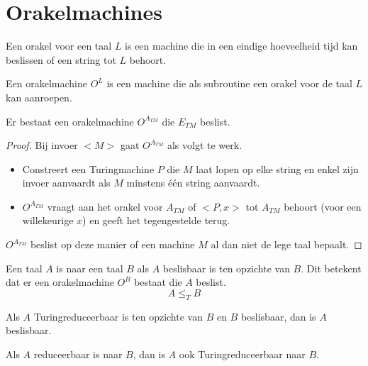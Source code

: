 \documentclass[main.tex]{subfiles}
\begin{document}
\section{Orakelmachines}
\label{sec:orakelmachines}

\begin{de}
  Een orakel voor een taal $L$ is een machine die in een eindige hoeveelheid tijd kan beslissen of een string tot $L$ behoort.
\end{de}

\begin{de}
  Een orakelmachine $O^{L}$ is een machine die als subroutine een orakel voor de taal $L$ kan aanroepen.
\end{de}

\begin{st}
  Er bestaat een orakelmachine $O^{A_{TM}}$ die $E_{TM}$ beslist.

  \begin{proof}
    Bij invoer $<M>$ gaat $O^{A_{TM}}$ als volgt te werk.
    \begin{itemize}
    \item Constreert een Turingmachine $P$ die $M$ laat lopen op elke string en enkel zijn invoer aanvaardt als $M$ minstens \'e\'en string aanvaardt.
    \item $O^{A_{TM}}$ vraagt aan het orakel voor $A_{TM}$ of $<P,x>$ tot $A_{TM}$ behoort (voor een willekeurige $x$) en geeft het tegengestelde terug.
    \end{itemize}
    $O^{A_{TM}}$ beslist op deze manier of een machine $M$ al dan niet de lege taal bepaalt.
  \end{proof}
\end{st}

\begin{de}
  Een taal $A$ is  naar een taal $B$ als $A$ beslisbaar is ten opzichte van $B$.
  Dit betekent dat er een orakelmachine $O^{B}$ bestaat die $A$ beslist.
  \[ A \le_{T} B \]
\end{de}

\begin{st}
  Als $A$ Turingreduceerbaar is ten opzichte van $B$ en $B$ beslisbaar, dan is $A$ beslisbaar.

\end{st}

\begin{st}
  Als $A$ reduceerbaar is naar $B$, dan is $A$ ook Turingreduceerbaar naar $B$.
\end{st}
\end{document}
